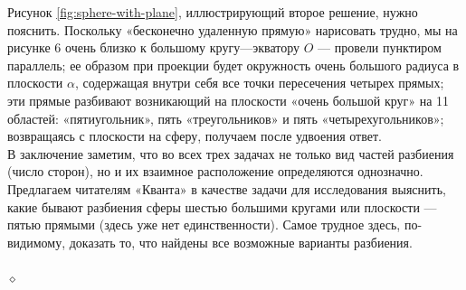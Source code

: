 \begin{paracol}{2}
\begin{column}
            Рисунок \ref{fig:sphere-with-plane}, иллюстрирующий второе решение, нужно пояснить. Поскольку «бесконечно удаленную прямую» нарисовать трудно, мы на рисунке 6 очень близко к большому кругу---экватору $O$ --- провели пунктиром параллель; ее образом при проекции будет окружность очень большого радиуса в плоскости $\alpha$, содержащая внутри себя все точки пересечения четырех прямых; эти прямые разбивают возникающий на плоскости «очень большой круг» на 11 областей: «пятиугольник», пять «треугольников» и пять «четырехугольников»; возвращаясь с плоскости на сферу, получаем после удвоения ответ.\\
            В заключение заметим, что во всех трех задачах не только вид частей разбиения (число сторон), но и их взаимное расположение определяются однозначно.\\
            Предлагаем читателям «Кванта» в качестве задачи для исследования выяснить, какие бывают разбиения сферы шестью большими кругами или плоскости --- пятью прямыми (здесь уже нет единственности). Самое трудное здесь, по-видимому, доказать то, что найдены все возможные варианты разбиения.\\
        \end{column}
    \end{paracol}
    
    \begin{paracol}{2}
        \begin{column}
        \end{column}

        \begin{column}
            \noindent\LARGE{$\diamond$}
            \vspace{0.5cm}
        \end{column}
    \end{paracol}
    
